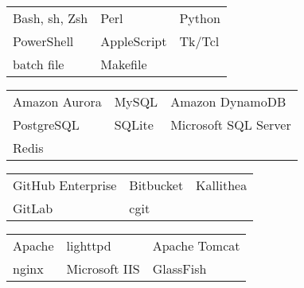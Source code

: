 \documentclass[a4paper,12pt]{memoir} %
\begin{document}



{\begin{tabular}{p{} p{} p{}}
	\bluebullet Bash, sh, Zsh    & \bluebullet Perl              & \bluebullet Python                 \\
	\bluebullet PowerShell       & \bluebullet AppleScript       & \bluebullet Tk/Tcl                 \\
	\bluebullet batch file       & \bluebullet Makefile
\end{tabular}}


{\begin{tabular}{p{} p{} p{}}
	\bluebullet Amazon Aurora    & \bluebullet MySQL             & \bluebullet Amazon DynamoDB        \\
	\bluebullet PostgreSQL       & \bluebullet SQLite            & \bluebullet Microsoft SQL Server   \\
	\bluebullet Redis
\end{tabular}}


{\begin{tabular}{p{} p{} p{}}
	\bluebullet GitHub Enterprise& \bluebullet Bitbucket         & \bluebullet Kallithea              \\
	\bluebullet GitLab           & \bluebullet cgit
\end{tabular}}


{\begin{tabular}{p{} p{} p{}}
	\bluebullet Apache           & \bluebullet lighttpd          & \bluebullet Apache Tomcat          \\
	\bluebullet nginx            & \bluebullet Microsoft IIS     & \bluebullet GlassFish              \\
\end{tabular}}
\end{document}
